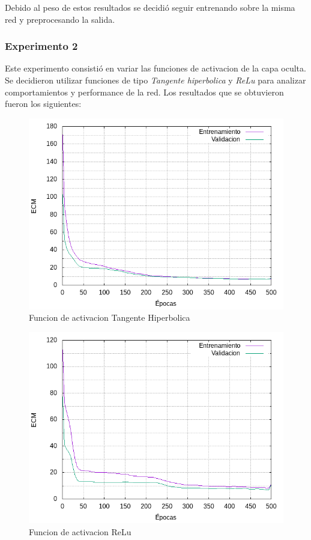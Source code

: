 Debido al peso de estos resultados se decidió seguir entrenando sobre la misma red y preprocesando la salida.

\subsubsection{Experimento 2}
Este experimento consistió en variar las funciones de activacion de la capa oculta. Se decidieron utilizar funciones de tipo \textit{Tangente hiperbolica} y \textit{ReLu}
para analizar comportamientos y performance de la red. Los resultados que se obtuvieron fueron los siguientes:

\begin{figure}[h!]
  \includegraphics[width=125mm]{imagenes/ej2/ex_2-1_red-9-17-2_errors.png}
  \caption{Funcion de activacion Tangente Hiperbolica}
\end{figure}

\begin{figure}[h!]
  \includegraphics[width=125mm]{imagenes/ej2/ex_2-2_red-9-17-2_errors.png}
  \caption{Funcion de activacion ReLu}
\end{figure}

